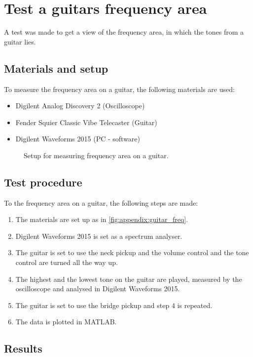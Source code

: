 \chapter*{Test a guitars frequency area}
A test was made to get a view of the frequency area, in which the tones from a guitar lies.

\section*{Materials and setup}
To measure the frequency area on a guitar, the following materials are used:
\begin{itemize}
\item Digilent Analog Discovery 2 (Oscilloscope)
\item Fender Squier Classic Vibe Telecaster (Guitar)
\item Digilent Waveforms 2015 (PC - software)
\end{itemize}

\begin{figure}[htbp!]
\centering
\def\svgwidth{\columnwidth}

\caption{Setup for measuring frequency area on a guitar.}
		\label{fig:appendix:guitar_freq}
\end{figure}

\section*{Test procedure}
To the frequency area on a guitar, the following steps are made:
\begin{enumerate}
\item The materials are set up as in \autoref{fig:appendix:guitar_freq}.
\item Digilent Waveforms 2015 is set as a spectrum analyser. 
\item The guitar is set to use the neck pickup and the volume control and the tone control are turned all the way up.
\item The highest and the lowest tone on the guitar are played, measured by the oscilloscope and analysed in Digilent Waveforms 2015.
\item The guitar is set to use the bridge pickup and step 4 is repeated. 
\item The data is plotted in MATLAB.
\end{enumerate}

\section*{Results}


